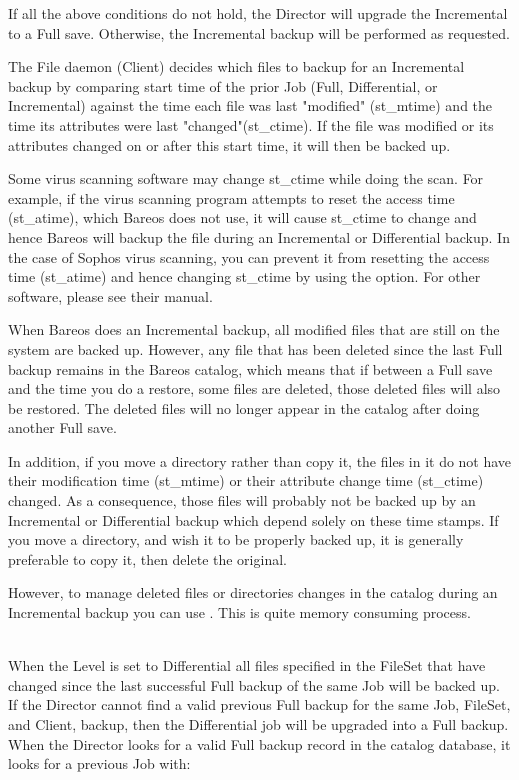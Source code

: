 {\begin{description}
\begin{description}
If all the above conditions do not hold, the Director will upgrade  the
Incremental to a Full save. Otherwise, the Incremental  backup will be
performed as requested.

The File daemon (Client) decides which files to backup for an
Incremental backup by comparing start time of the prior Job (Full,
Differential, or Incremental) against the time each file was last
"modified" (st\_mtime) and the time its attributes were last
"changed"(st\_ctime).  If the file was modified or its attributes
changed on or after this start time, it will then be backed up.

Some virus scanning software may change st\_ctime while
doing the scan.  For example, if the virus scanning program attempts to
reset the access time (st\_atime), which Bareos does not use, it will
cause st\_ctime to change and hence Bareos will backup the file during
an Incremental or Differential backup.  In the case of Sophos virus
scanning, you can prevent it from resetting the access time (st\_atime)
and hence changing st\_ctime by using the 
option.  For other software, please see their manual.

When Bareos does an Incremental backup, all modified files that are
still on the system are backed up.  However, any file that has been
deleted since the last Full backup remains in the Bareos catalog,
which means that if between a Full save and the time you do a
restore, some files are deleted, those deleted files will also be
restored.  The deleted files will no longer appear in the catalog
after doing another Full save.

In addition, if you move a directory rather than copy it, the files in
it do not have their modification time (st\_mtime) or their attribute
change time (st\_ctime) changed.  As a consequence, those files will
probably not be backed up by an Incremental or Differential backup which
depend solely on these time stamps.  If you move a directory, and wish
it to be properly backed up, it is generally preferable to copy it, then
delete the original.

However, to manage deleted files or directories changes in the
catalog during an Incremental backup you can use .
This is quite memory consuming process.

\item [Differential] \hfill \\
When the Level is set to Differential
all files specified in the FileSet that have changed since the last
successful Full backup of the same Job will be backed up.
If the Director cannot find a
valid previous Full backup for the same Job, FileSet, and Client,
backup, then the Differential job will be upgraded into a Full backup.
When the Director looks for a valid Full backup record in the catalog
database, it looks for a previous Job with:


\end{description}
\end{description}}
